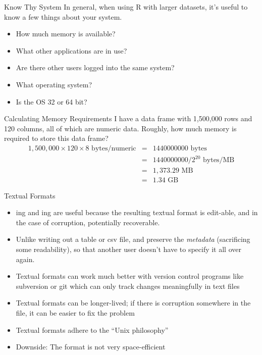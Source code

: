 \documentclass[aspectratio=169]{beamer}
\begin{document}
\begin{frame}{Know Thy System}
In general, when using R with larger datasets, it's useful to know a
few things about your system.
\begin{itemize}
\item
How much memory is available?
\item
What other applications are in use?
\item
Are there other users logged into the same system?
\item
What operating system?
\item
Is the OS 32 or 64 bit?
\end{itemize}
\end{frame}

\begin{frame}{Calculating Memory Requirements}
I have a data frame with 1,500,000 rows and 120 columns, all of which
are numeric data.  Roughly, how much memory is required to store this
data frame?
\begin{eqnarray*}
1,500,000\times 120 \times\mbox{$8$ bytes/numeric}
& = &
1440000000\mbox{ bytes}\\
& = &
1440000000 / 2^{20}\mbox{ bytes/MB}\\
& = &
1,373.29\mbox{ MB}\\
& = &
1.34\mbox{ GB}
\end{eqnarray*}
\end{frame}


\begin{frame}{Textual Formats}
\begin{itemize}
\item
{}ing and ing are useful because the resulting
textual format is edit-able, and in the case of corruption,
potentially recoverable.
\item
Unlike writing out a table or csv file,  and 
preserve the \textit{metadata} (sacrificing some readability), so that
another user doesn't have to specify it all over again.
\item
Textual formats can work much better with version control programs
like subversion or git which can only track changes meaningfully in
text files
\item Textual formats can be longer-lived; if there is corruption
  somewhere in the file, it can be easier to fix the problem
\item
Textual formats adhere to the ``Unix philosophy''
\item Downside: The format is not very space-efficient
\end{itemize}
\end{frame}
\end{document}
